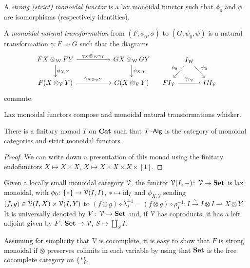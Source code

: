 \documentclass[a4paper,11pt,oneside,openany]{scrbook}
\begin{document}
\begin{defn}
	A \emph{strong (strict) monoidal functor} is a lax monoidal functor such that $\phi_0$ and $\phi$ are isomorphisms (respectively identities).

	A \emph{monoidal natural transformation} from $(F,\phi_0,\phi)$ to $(G,\psi_0,\psi)$ is a natural transformation $\gamma\colon F\Rightarrow G$ such that the diagrams
	\[
		\begin{tikzcd}[column sep=5.0em]
			FX\otimes_{\W}FY\ar[r, "\gamma_X\otimes_{\W}\gamma_Y"]\ar[d, "\phi_{X,Y}"]
			& GX\otimes_{\W}GY\ar[d, "\psi_{X,Y}"] \\
			F(X\otimes_{\V}Y)\ar[r, "\gamma_{X\otimes_{\V}Y}"]
			& G(X\otimes_{\V}Y)
		\end{tikzcd}
		\quad
		\begin{tikzcd}[column sep=tiny]
			& I_{\W}\ar[dl, "\phi_0", swap]\ar[dr, "\psi_0"] \\
			FI_{\V}\ar[rr, "\gamma_{I_{\V}}"]
			&& GI_{\V}
		\end{tikzcd}
	\]
	commute.
\end{defn}

\begin{prop}
	Lax monoidal functors compose and monoidal natural transformations whisker.
\end{prop}

\begin{prop}
	There is a finitary monad $T$ on ${\normalfont\textbf{Cat}}$ such that $T\operatorname{-\mathsf{Alg}}$ is the category of monoidal categories and strict monoidal functors.
\end{prop}

\begin{proof}
	We can write down a presentation of this monad using the finitary endofunctors $X\mapsto X\times X$, $X\mapsto X\times X\times X\times [1]$.
\end{proof}

\begin{exmp}
	Given a locally small monoidal category $\operatorname{\mathcal{V}}$, the functor $\operatorname{\mathcal{V}}(I,-)\colon\operatorname{\mathcal{V}}\rightarrow{\normalfont\textbf{Set}}$ is lax monoidal, with $\phi_0\colon\{*\}\rightarrow\operatorname{\mathcal{V}}(I,I)$, $*\mapsto\operatorname{id}_{I}$ and $\phi_{X,Y}$ sending $(f,g)\in\operatorname{\mathcal{V}}(I,X)\times\operatorname{\mathcal{V}}(I,Y)$ to $(f\otimes g)\circ\lambda_I^{-1}=(f\otimes g)\circ\rho_I^{-1}\colon I\xrightarrow{\sim} I\otimes I\rightarrow X\otimes Y$. It is universally denoted by $V\colon\operatorname{\mathcal{V}}\rightarrow{\normalfont\textbf{Set}}$ and, if $\operatorname{\mathcal{V}}$ has coproducts, it has a left adjoint given by $F\colon{\normalfont\textbf{Set}}\rightarrow\operatorname{\mathcal{V}}$, $S\mapsto\amalg_S I$.

	Assuming for simplicity that $\operatorname{\mathcal{V}}$ is cocomplete, it is easy to show that $F$ is strong monoidal if $\otimes$ preserves colimits in each variable by using that ${\normalfont\textbf{Set}}$ is the free cocomplete category on $\{*\}$.
\end{exmp}
\end{document}
